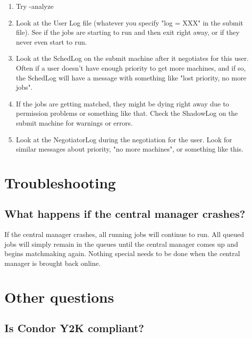 \begin{enumerate}
\item Try  -analyze 

\item Look at the User Log file (whatever you specify "log = XXX" in the
submit file).  See if the jobs are starting to run and then exit right
away, or if they never even start to run.

\item Look at the SchedLog on the submit machine after it negotiates
for this user.  Often if a user doesn't have enough priority to get
more machines, and if so, the SchedLog will have a message with something
like "lost priority, no more jobs".

\item If the jobs are getting matched, they might be dying right away due
to permission problems or something like that.  Check the ShadowLog on
the submit machine for warnings or errors.

\item Look at the NegotiatorLog during the negotiation for the user.
Look for similar messages about priority, "no more machines", or
something like this.  

\end{enumerate}

\section{Troubleshooting}


\subsection{What happens if the central manager crashes?} 

If the central manager crashes, all running jobs will continue to
run. All queued jobs will simply remain in the queues until the central
manager comes up and begins matchmaking again.  Nothing special needs
to be done when the central manager is brought back online. 


\section{Other questions}


\subsection{Is Condor Y2K compliant?}

